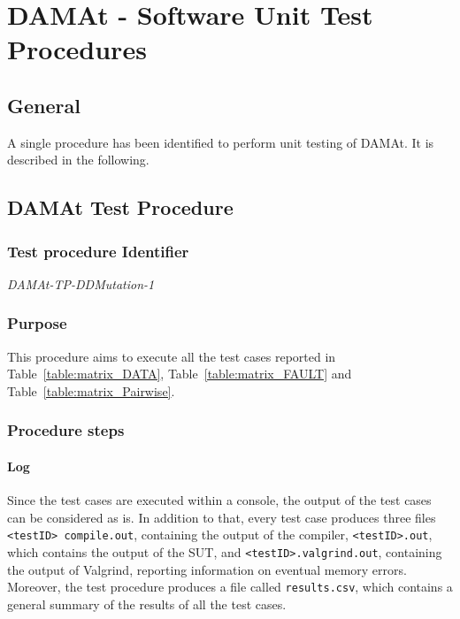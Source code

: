
\chapter{DAMAt - Software Unit Test Procedures}
\label{chap:proc_DAMAt}

\section{General}

A single procedure has been identified to perform unit testing of DAMAt. It is described in the following.

\section{DAMAt Test Procedure}

\subsection{Test procedure Identifier}

\emph{DAMAt-TP-DDMutation-1}


\subsection{Purpose}

This procedure aims to execute all the test cases reported in Table~\ref{table:matrix_DATA}, Table~\ref{table:matrix_FAULT} and Table~\ref{table:matrix_Pairwise}.

\subsection{Procedure steps}

\subsubsection{Log}
Since the test cases are executed within a console, the output of the test cases can be considered as is.
In addition to that, every test case produces three files \texttt{<testID> compile.out}, containing the output of the compiler, \texttt{<testID>.out}, which contains the output of the SUT, and \texttt{<testID>.valgrind.out}, containing the output of Valgrind, reporting information on eventual memory errors.
Moreover, the test procedure produces a file called \texttt{results.csv}, which contains a general summary of the results of all the test cases.

